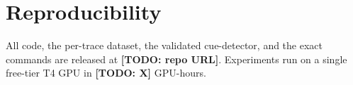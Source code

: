 \documentclass[11pt]{article}
\newcommand{\todo}[1]{{\color{red}\textbf{[TODO: #1]}}}
\begin{document}
\section*{Reproducibility}
All code, the per-trace dataset, the validated cue-detector, and the exact
commands are released at \todo{repo URL}. Experiments run on a single free-tier
T4 GPU in \todo{X} GPU-hours.



\end{document}
